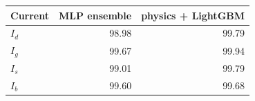\begin{tabular}{lrr}
\hline
Current & MLP ensemble & physics + LightGBM \\
\hline
$I_{d}$ & 98.98 & 99.79 \\
$I_{g}$ & 99.67 & 99.94 \\
$I_{s}$ & 99.01 & 99.79 \\
$I_{b}$ & 99.60 & 99.68 \\
\hline
\end{tabular}
